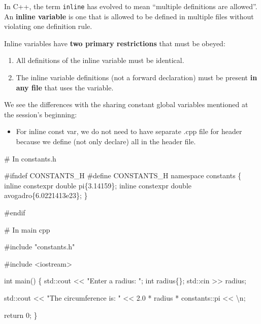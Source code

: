 \documentclass[
  letterpaper,
  DIV=11,
  numbers=noendperiod]{scrreprt}
\newenvironment{Shaded}{\begin{snugshade}}{\end{snugshade}}
\newcommand{\CommentTok}[1]{\textcolor[rgb]{0.37,0.37,0.37}{#1}}
\newcommand{\DecValTok}[1]{\textcolor[rgb]{0.68,0.00,0.00}{#1}}
\newcommand{\ErrorTok}[1]{\textcolor[rgb]{0.68,0.00,0.00}{#1}}
\newcommand{\FloatTok}[1]{\textcolor[rgb]{0.68,0.00,0.00}{#1}}
\newcommand{\FunctionTok}[1]{\textcolor[rgb]{0.28,0.35,0.67}{#1}}
\newcommand{\NormalTok}[1]{\textcolor[rgb]{0.00,0.23,0.31}{#1}}
\newcommand{\SpecialCharTok}[1]{\textcolor[rgb]{0.37,0.37,0.37}{#1}}
\newcommand{\StringTok}[1]{\textcolor[rgb]{0.13,0.47,0.30}{#1}}
\providecommand{\tightlist}{%
  \setlength{\itemsep}{0pt}\setlength{\parskip}{0pt}}\usepackage{longtable,booktabs,array}
\begin{document}
In C++, the term \texttt{inline} has evolved to mean ``multiple
definitions are allowed''. An \textbf{inline variable} is one that is
allowed to be defined in multiple files without violating one definition
rule.

Inline variables have \textbf{two primary restrictions} that must be
obeyed:

\begin{enumerate}
\def\labelenumi{\arabic{enumi}.}
\tightlist
\item
  All definitions of the inline variable must be identical.
\item
  The inline variable definitions (not a forward declaration) must be
  present \textbf{in any file} that uses the variable.
\end{enumerate}

We see the differences with the sharing constant global variables
mentioned at the session's beginning:

\begin{itemize}
\tightlist
\item
  For inline const var, we do not need to have separate .cpp file for
  header because we define (not only declare) all in the header file.
\end{itemize}

\begin{Shaded}
\begin{Highlighting}[]
\CommentTok{\# In constants.h}

\CommentTok{\#ifndef CONSTANTS\_H}
\CommentTok{\#define CONSTANTS\_H}
\NormalTok{namespace constants}
\NormalTok{\{}
\NormalTok{  inline constexpr double pi\{}\FloatTok{3.14159}\NormalTok{\};}
\NormalTok{  inline constexpr double avogadro\{}\FloatTok{6.0221413e23}\NormalTok{\};}
\NormalTok{\}}

\CommentTok{\#endif}

\CommentTok{\# In main cpp}

\CommentTok{\#include "constants.h"}

\CommentTok{\#include \textless{}iostream\textgreater{}}

\NormalTok{int }\FunctionTok{main}\NormalTok{()}
\NormalTok{\{}
\NormalTok{    std}\SpecialCharTok{::}\NormalTok{cout }\SpecialCharTok{\textless{}}\ErrorTok{\textless{}} \StringTok{"Enter a radius: "}\NormalTok{;}
\NormalTok{    int radius\{\};}
\NormalTok{    std}\SpecialCharTok{::}\NormalTok{cin }\SpecialCharTok{\textgreater{}}\ErrorTok{\textgreater{}}\NormalTok{ radius;}

\NormalTok{    std}\SpecialCharTok{::}\NormalTok{cout }\SpecialCharTok{\textless{}}\ErrorTok{\textless{}} \StringTok{"The circumference is: "} \SpecialCharTok{\textless{}}\ErrorTok{\textless{}} \FloatTok{2.0} \SpecialCharTok{*}\NormalTok{ radius }\SpecialCharTok{*}\NormalTok{ constants}\SpecialCharTok{::}\NormalTok{pi }\SpecialCharTok{\textless{}}\ErrorTok{\textless{}} \StringTok{\textquotesingle{}}\SpecialCharTok{\textbackslash{}n}\StringTok{\textquotesingle{}}\NormalTok{;}

\NormalTok{    return }\DecValTok{0}\NormalTok{;}
\NormalTok{\}}
\end{Highlighting}
\end{Shaded}
\end{document}
